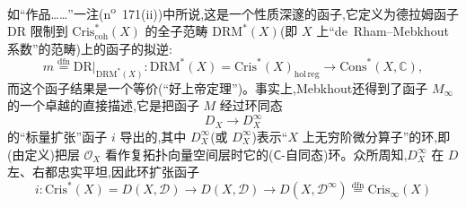 如“作品……”一注(n\textsuperscript{o}~171(ii))中所说,这是一个性质深邃的函子,它定义为德拉姆函子 $\mathrm{DR}$ 限制到 $\mathrm{Cris}^{*}_{\mathrm{coh}}(X)$ 的全子范畴 $\mathrm{DRM}^{*}(X)$(即 $X$ 上“de~Rham--Mebkhout系数”的范畴)上的函子的拟逆:
\begin{equation*}
m\overset{\mathrm{dfn}}{=}\mathrm{DR}|_{\mathrm{DRM}^{*}(X)} : \mathrm{DRM}^{*}(X)=\mathrm{Cris}^{*}(X)_{\mathrm{hol\,reg}}\longrightarrow \mathrm{Cons}^{*}(X,\mathbb{C}),
\tag{2}
\end{equation*}
而这个函子结果是一个等价(“好上帝定理”)。事实上,Mebkhout还得到了函子 $M_{\infty}$ 的一个卓越的直接描述,它是把函子 $M$ 经过环同态
\begin{equation*}
D_{X}\longrightarrow D^{\infty}_{X}
\tag{3}
\end{equation*}
的“标量扩张”函子 $i$ 导出的,其中 $D^{\infty}_{X}$(或 $D_{X}^{\infty}$)表示“$X$ 上无穷阶微分算子”的环,即(由定义)把层 $\mathcal{O}_{X}$ 看作复拓扑向量空间层时它的($\mathsf{C}$-自同态)环。众所周知,$D^{\infty}_{X}$ 在 $D$ 左、右都忠实平坦,因此环扩张函子
\begin{equation*}
i : \mathrm{Cris}^{*}(X)=D(X,\mathcal{D})\longrightarrow D(X,\mathcal{D})\longrightarrow D(X,\mathcal{D}^{\infty})\overset{\mathrm{dfn}}{=}\mathrm{Cris}_{\infty}(X)
\tag{4}
\end{equation*}


